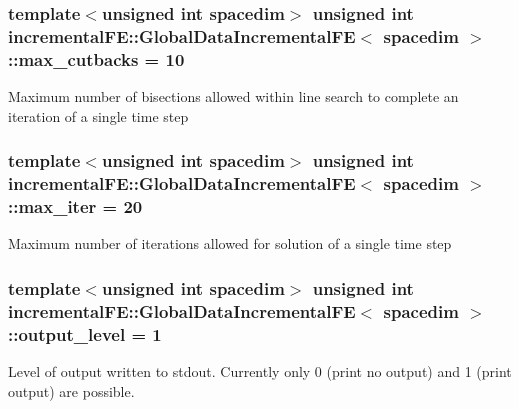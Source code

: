 \subsubsection[{\texorpdfstring{max\+\_\+cutbacks}{max_cutbacks}}]{\setlength{\rightskip}{0pt plus 5cm}template$<$unsigned int spacedim$>$ unsigned int {\bf incremental\+F\+E\+::\+Global\+Data\+Incremental\+FE}$<$ spacedim $>$\+::max\+\_\+cutbacks = 10\hspace{0.3cm}{\ttfamily [private]}}\hypertarget{classincremental_f_e_1_1_global_data_incremental_f_e_a7ae58573e9cc241a14976bf19351ba63}{}\label{classincremental_f_e_1_1_global_data_incremental_f_e_a7ae58573e9cc241a14976bf19351ba63}
Maximum number of bisections allowed within line search to complete an iteration of a single time step 
\subsubsection[{\texorpdfstring{max\+\_\+iter}{max_iter}}]{\setlength{\rightskip}{0pt plus 5cm}template$<$unsigned int spacedim$>$ unsigned int {\bf incremental\+F\+E\+::\+Global\+Data\+Incremental\+FE}$<$ spacedim $>$\+::max\+\_\+iter = 20\hspace{0.3cm}{\ttfamily [private]}}\hypertarget{classincremental_f_e_1_1_global_data_incremental_f_e_ad15c334652b6a9d6843c360c6e2005ec}{}\label{classincremental_f_e_1_1_global_data_incremental_f_e_ad15c334652b6a9d6843c360c6e2005ec}
Maximum number of iterations allowed for solution of a single time step 
\subsubsection[{\texorpdfstring{output\+\_\+level}{output_level}}]{\setlength{\rightskip}{0pt plus 5cm}template$<$unsigned int spacedim$>$ unsigned int {\bf incremental\+F\+E\+::\+Global\+Data\+Incremental\+FE}$<$ spacedim $>$\+::output\+\_\+level = 1\hspace{0.3cm}{\ttfamily [private]}}\hypertarget{classincremental_f_e_1_1_global_data_incremental_f_e_a0d5cf3ecf70ec61771bbcfe45d0e6b5d}{}\label{classincremental_f_e_1_1_global_data_incremental_f_e_a0d5cf3ecf70ec61771bbcfe45d0e6b5d}
Level of output written to stdout. Currently only 0 (print no output) and 1 (print output) are possible. 
